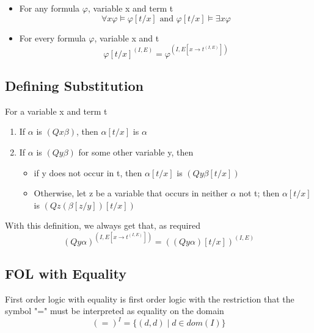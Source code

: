 \documentclass{article}
\begin{document}
\begin{itemize}
\item For any formula \(\varphi\), variable x and term t
$$ \forall x \varphi \models \varphi[t/x] \text{   and    } \varphi[t/x] \models \exists x \varphi $$
\item For every formula \(\varphi\), variable x and t 
$$\varphi[t/x]^{(I,E)} = \varphi^{(I,E[x \rightarrow t^{(I,E)}])}$$
\end{itemize}

\subsection{Defining Substitution}
For a variable x and term t 
\begin{enumerate}
\item If \(\alpha\) is \((Q x \beta)\), then \(\alpha[t/x]\) is \(\alpha\) 
\item If \(\alpha\) is \((Q y \beta)\) for some other variable y, then 
\begin{itemize}
\item if y does not occur in t, then \(\alpha[t/x]\) is \((Qy\beta [t/x])\) 
\item Otherwise, let z be a variable that occurs in neither \(\alpha\) not t; then \(\alpha[t/x]\) is \((Qz(\beta[z/y])[t/x])\)
\end{itemize}
\end{enumerate}
With this definition, we always get that, as required
$$ (Qy \alpha)^{(I,E[x \rightarrow t ^{(I,E)}])} = ((Qy\alpha) [t/x])^{(I,E)} $$

\subsection{FOL with Equality}
First order logic with equality is first order logic with the restriction that the symbol "=" must be interpreted as equality on the domain 
$$ (=)^I = \{(d,d) \mid d \in dom(I)\} $$
\end{document}
